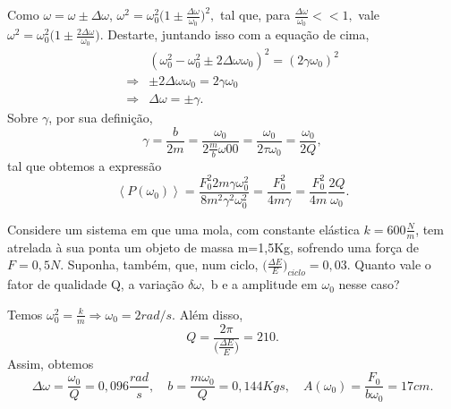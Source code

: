 \documentclass[PhysicsII/physicsII_notes.tex]{subfiles}
\begin{document}
Como \(\omega = \omega \pm \Delta \omega \), \(\omega^{2} = \omega_{0}^{2}\biggl(1\pm \frac{\Delta \omega }{\omega_{0}}\biggr)^{2},\) tal que, para \(\frac{\Delta \omega }{\omega_{0}} <<1,\)
vale \(\omega ^{2} = \omega_{0}^{2}\biggl(1 \pm \frac{2\Delta \omega }{\omega_{0}}\biggr).\) Destarte, juntando isso com a equação de cima,
\begin{align*}
	            & (\omega_{0}^{2}-\omega_{0}^{2}\pm 2\Delta \omega \omega_{0})^{2} = (2\gamma \omega_{0})^{2} \\
	\Rightarrow & \pm 2\Delta \omega \omega_{0} = 2\gamma \omega_{0}                                          \\
	\Rightarrow & \Delta \omega = \pm\gamma .
\end{align*}
Sobre \(\gamma \), por sua definição,
\[
	\gamma = \frac{b}{2m} = \frac{\omega_{0}}{2\frac{m}{b}\omega 00} = \frac{\omega_{0}}{2\tau \omega_{0}} = \frac{\omega_{0}}{2Q},
\]
tal que obtemos a expressão
\[
	\left< P(\omega_{0}) \right> = \frac{F_{0}^{2}2m\gamma \omega_{0}^{2}}{8m^{2}\gamma^{2}\omega_{0}^{2}} = \frac{F_{0}^{2}}{4m\gamma } = \frac{F_{0}^{2}}{4m}\frac{2Q}{\omega_{0}}.
\]
\begin{example}
	Considere um sistema em que uma mola, com constante elástica \(k = 600 \frac{N}{m}\), tem atrelada à sua ponta um objeto de massa m=1,5Kg, sofrendo uma força de
	\(F=0,5N\). Suponha, também, que, num ciclo, \(\biggl(\frac{\Delta E}{E}\biggr)_{ciclo}=0,03\). Quanto vale o fator de qualidade Q, a variação \(\delta \omega ,\) b e a amplitude em \(\omega_{0}\) nesse caso?

	Temos \(\omega_{0}^{2} = \frac{k}{m} \Rightarrow \omega_{0} = 2rad/s\). Além disso,
	\[
		Q = \frac{2\pi }{\biggl(\frac{\Delta E}{E}\biggr)} = 210.
	\]
	Assim, obtemos
	\[
		\Delta \omega  = \frac{\omega_{0}}{Q} = 0,096\frac{rad}{s},\quad b = \frac{m\omega_{0}}{Q} = 0,144 Kg\dot{}s,\quad A(\omega_{0}) = \frac{F_{0}}{b\omega_{0}} =17cm.
	\]
\end{example}
\end{document}
